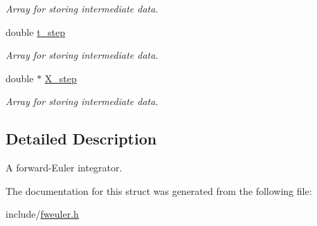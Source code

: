\begin{DoxyCompactItemize}
\begin{DoxyCompactList}\small\item\em Array for storing intermediate data. \end{DoxyCompactList}\item 
\hypertarget{structfweuler_a34810f998eae03fbeaa53d37b73ec366}{}double \hyperlink{structfweuler_a34810f998eae03fbeaa53d37b73ec366}{t\+\_\+step}\label{structfweuler_a34810f998eae03fbeaa53d37b73ec366}

\begin{DoxyCompactList}\small\item\em Array for storing intermediate data. \end{DoxyCompactList}\item 
\hypertarget{structfweuler_aceb1a0fdb7cb920512268ff3031b70dd}{}double $\ast$ \hyperlink{structfweuler_aceb1a0fdb7cb920512268ff3031b70dd}{X\+\_\+step}\label{structfweuler_aceb1a0fdb7cb920512268ff3031b70dd}

\begin{DoxyCompactList}\small\item\em Array for storing intermediate data. \end{DoxyCompactList}\end{DoxyCompactItemize}


\subsection{Detailed Description}
A forward-\/\+Euler integrator. 

The documentation for this struct was generated from the following file\+:\begin{DoxyCompactItemize}
\item 
include/\hyperlink{fweuler_8h}{fweuler.\+h}\end{DoxyCompactItemize}

